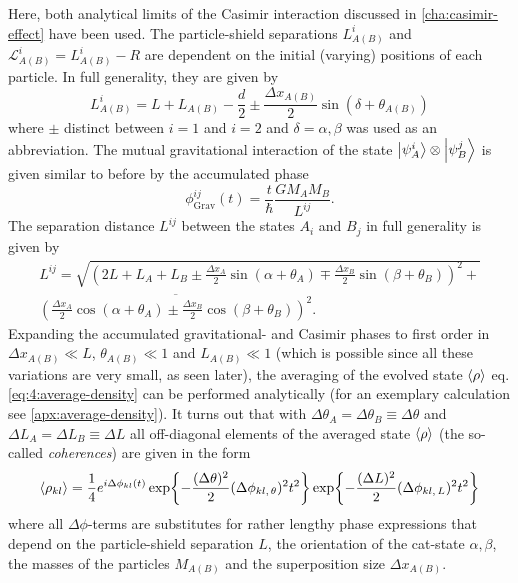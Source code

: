 Here, both analytical limits of the Casimir interaction discussed in \cref{cha:casimir-effect} have been used.
The particle-shield separations $L^i_{A(B)}$ and $\mathscr{L}^i_{A(B)} = L^i_{A(B)}-R$ are dependent on the initial (varying) positions of each particle.
In full generality, they are given by
\begin{equation}\label{eq:4:L-casimir}
  L^i_{A(B)} = L + L_{A(B)} - \frac{d}{2} \pm \frac{\Delta x_{A(B)}}{2} \sin(\delta + \theta_{A(B)})
\end{equation}
where $\pm$ distinct between $i=1$ and $i=2$ and $\delta = \alpha, \beta$ was used as an abbreviation.
The mutual gravitational interaction of the state $\ket{\psi^i_A}\otimes\ket{\psi^j_B}$ is given similar to before by the accumulated phase
\begin{equation}
  \phi^{ij}_\mathrm{Grav}(t) = \frac{t}{\hbar} \frac{G M_A M_B}{L^{ij}} .
\end{equation}
The separation distance $L^{ij}$ between the states $A_i$ and $B_j$ in full generality is given by
\begin{multline}\label{eq:4:L-gravity}
  L^{ij} = \sqrt{\left(2L + L_A + L_B \pm \frac{\Delta x_A}{2}\sin(\alpha + \theta_A) \mp \frac{\Delta x_B}{2}\sin(\beta + \theta_B)\right)^2 +} \\ \overline{\left(\frac{\Delta x_A}{2}\cos(\alpha + \theta_A) \pm \frac{\Delta x_B}{2}\cos(\beta + \theta_B)\right)^2} .
\end{multline}
Expanding the accumulated gravitational- and Casimir phases to first order in $\Delta x_{A(B)} \ll L$, $\theta_{A(B)} \ll 1$ and $L_{A(B)} \ll 1$ (which is possible since all these variations are very small, as seen later), the averaging of the evolved state $\left\langle\rho\right\rangle$ eq. \eqref{eq:4:average-density} can be performed analytically (for an exemplary calculation see \cref{apx:average-density}).
It turns out that with $\Delta \theta_A = \Delta \theta_B \equiv \Delta\theta$ and $\Delta L_A = \Delta L_B \equiv \Delta L$ all off-diagonal elements of the averaged state $\left\langle\rho\right\rangle$ (the so-called \emph{coherences}) are given in the form
\begin{equation}\label{eq:4:average-density-element}
  \left\langle\rho_{kl}\right\rangle = \frac{1}{4} e^{i \Delta \phi_{kl}(t)} \exp{-\frac{(\Delta\theta)^2}{2} (\Delta\phi_{kl,\,\theta})^2 t^2} \exp{-\frac{(\Delta L)^2}{2} (\Delta\phi_{kl,\,L})^2 t^2}
\end{equation}
where all $\Delta \phi$-terms are substitutes for rather lengthy phase expressions that depend on the particle-shield separation $L$, the orientation of the cat-state $\alpha, \beta$, the masses of the particles $M_{A(B)}$ and the superposition size $\Delta x_{A(B)}$.
